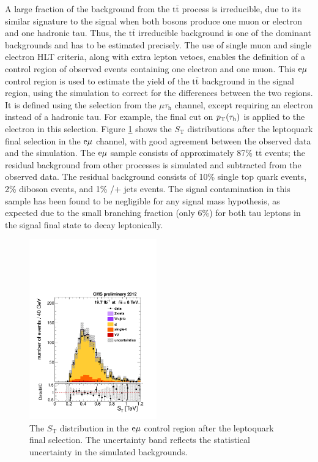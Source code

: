 \documentclass[12pt]{thesis}  %
\newcommand{\tauh}{\ensuremath{\tau_{\text{h}}}\xspace}
\newcommand{\Pe}{\ensuremath{\cmsSymbolFace{e}}\xspace}
\newcommand{\mutau}{\ensuremath{\mu\tauh}\xspace}
\newcommand{\emu}{\ensuremath{\Pe\mu}\xspace}
\renewcommand{\ttbar}{\ensuremath{\mathrm{t}\overline{\mathrm{t}}}\xspace}
\def\ST{\ensuremath{S_{\text{T}}}\xspace}
\begin{document}
A large fraction of the background from the \ttbar process is irreducible, due to its similar signature to the signal when both \W bosons produce one muon or electron and one hadronic tau. Thus, the \ttbar irreducible background is one of the dominant backgrounds and has to be estimated precisely. The use of single muon and single electron HLT criteria, along with extra lepton vetoes, enables the definition of a control region of observed events containing one electron and one muon. This \emu control region is used to estimate the yield of the \ttbar background in the signal region, using the simulation to correct for the differences between the two regions. It is defined using the selection from the \mutau channel, except requiring an electron instead of a hadronic tau. For example, the final cut on $\pt(\tauh)$ is applied to the electron in this selection. Figure \ref{fig:ttCC} shows the \ST distributions after the leptoquark final selection in the $\emu$ channel, with good agreement between the observed data and the simulation. The \emu sample consists of approximately 87\% \ttbar events; the residual background from other processes is simulated and subtracted from the observed data. The residual background consists of 10\% single top quark events, 2\% diboson events, and 1\% \W/\Z + jets events. The signal contamination in this sample has been found to be negligible for any signal mass hypothesis, as expected due to the small branching fraction (only 6\%) for both tau leptons in the signal final state to decay leptonically.

\begin{figure}[hbt]
  \begin{center}
    \includegraphics[width=0.49\textwidth]{figures/bkgEstim/STbjetFinalEMu.pdf}
    \caption{The \ST distribution in the $\emu$ control region after the leptoquark final selection. The uncertainty band reflects the statistical uncertainty in the simulated backgrounds.}
    \label{fig:ttCC}
  \end{center}
\end{figure}
\end{document}
